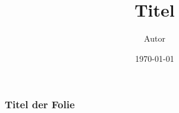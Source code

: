 \documentclass{beamer}
\title{Titel}
\author{Autor}
\date{\today}
\begin{document}
\begin{frame}
    \titlepage
\end{frame}

\begin{frame}
    \frametitle{Titel der Folie}
\end{frame}
\end{document}
